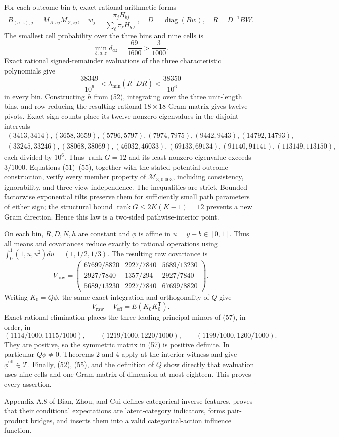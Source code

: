 For each outcome bin \(b\), exact rational arithmetic forms
\[
B_{(a,z),j}=M_{A,aj}M_{Z,zj},\quad
w_j=\frac{\pi_jH_{bj}}{\sum_\ell\pi_\ell H_{b\ell}},\quad
D=\operatorname{diag}(Bw),\quad R=D^{-1}BW. \tag{52}
\]
The smallest cell probability over the three bins and nine cells is
\[
\min_{b,a,z}d_{az}=\frac{69}{1600}>\frac3{1000}. \tag{53}
\]
Exact rational signed-remainder evaluations of the three characteristic polynomials give
\[
\frac{38349}{10^6}<\lambda_{\min}(R^{\mathsf T}DR)<\frac{38350}{10^6} \tag{54}
\]
in every bin.  Constructing \(h\) from (52), integrating over the three unit-length bins, and row-reducing the resulting rational \(18\times18\) Gram matrix gives twelve pivots.  Exact sign counts place its twelve nonzero eigenvalues in the disjoint intervals
\[
\begin{gathered}
(3413,3414),(3658,3659),(5796,5797),(7974,7975),
(9442,9443),(14792,14793),\\
(33245,33246),(38068,38069),(46032,46033),(69133,69134),
(91140,91141),(113149,113150),
\end{gathered} \tag{55}
\]
each divided by \(10^6\).  Thus \(\operatorname{rank}G=12\) and its least nonzero eigenvalue exceeds \(3/1000\).  Equations (51)--(55), together with the stated potential-outcome construction, verify every member property of \(\mathcal M_{3,0.003}\), including consistency, ignorability, and three-view independence.  The inequalities are strict.  Bounded factorwise exponential tilts preserve them for sufficiently small path parameters of either sign; the structural bound \(\operatorname{rank}G\leq2K(K-1)=12\) prevents a new Gram direction.  Hence this law is a two-sided pathwise-interior point.

On each bin, \(R,D,N,h\) are constant and \(\phi\) is affine in \(u=y-b\in[0,1]\).  Thus all means and covariances reduce exactly to rational operations using
\(\int_0^1(1,u,u^2)du=(1,1/2,1/3)\).  The resulting raw covariance is
\[
V_{\mathrm{raw}}=
\begin{pmatrix}
67699/8820&2927/7840&5689/13230\\
2927/7840&1357/294&2927/7840\\
5689/13230&2927/7840&67699/8820
\end{pmatrix}. \tag{56}
\]
Writing \(K_0=Q\phi\), the same exact integration and orthogonality of \(Q\) give
\[
V_{\mathrm{raw}}-V_{\mathrm{eff}}=E(K_0K_0^{\mathsf T}). \tag{57}
\]
Exact rational elimination places the three leading principal minors of (57), in order, in
\[
(1114/1000,1115/1000),\qquad(1219/1000,1220/1000),\qquad
(1199/1000,1200/1000). \tag{58}
\]
They are positive, so the symmetric matrix in (57) is positive definite.  In particular \(Q\phi\ne0\).  Theorems 2 and 4 apply at the interior witness and give \(\phi^{\mathrm{eff}}\in\mathcal T\).  Finally, (52), (55), and the definition of \(Q\) show directly that evaluation uses nine cells and one Gram matrix of dimension at most eighteen.  This proves every assertion.

Appendix A.8 of Bian, Zhou, and Cui defines categorical inverse features, proves that their conditional expectations are latent-category indicators, forms pair-product bridges, and inserts them into a valid categorical-action influence function.
